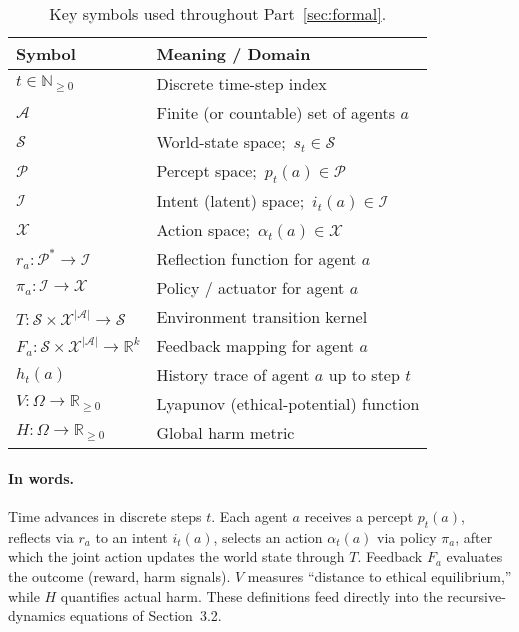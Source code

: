 \begin{table}[ht!]
\centering
\renewcommand{\arraystretch}{1.2}
\begin{tabular}{@{}ll@{}}
\toprule
\textbf{Symbol} & \textbf{Meaning / Domain} \\ \midrule
$t \in \mathbb{N}_{\ge 0}$ & Discrete time-step index \\
$\mathcal{A}$ & Finite (or countable) set of agents $a$ \\
$\mathcal{S}$ & World-state space;\ $s_t \in \mathcal{S}$ \\
$\mathcal{P}$ & Percept space;\ $p_t(a) \in \mathcal{P}$ \\
$\mathcal{I}$ & Intent (latent) space;\ $i_t(a) \in \mathcal{I}$ \\
$\mathcal{X}$ & Action space;\ $\alpha_t(a) \in \mathcal{X}$ \\
$r_a : \mathcal{P}^\ast \!\to\! \mathcal{I}$ & Reflection function for agent $a$ \\
$\pi_a : \mathcal{I} \!\to\! \mathcal{X}$ & Policy / actuator for agent $a$ \\
$T : \mathcal{S} \!\times\! \mathcal{X}^{|\mathcal{A}|} \!\to\! \mathcal{S}$ & Environment transition kernel \\
$F_a : \mathcal{S} \!\times\! \mathcal{X}^{|\mathcal{A}|} \!\to\! \mathbb{R}^k$ & Feedback mapping for agent $a$ \\
$h_t(a)$ & History trace of agent $a$ up to step $t$ \\
$V : \Omega \!\to\! \mathbb{R}_{\ge 0}$ & Lyapunov (ethical-potential) function \\
$H : \Omega \!\to\! \mathbb{R}_{\ge 0}$ & Global harm metric \\ \bottomrule
\end{tabular}
\caption{Key symbols used throughout Part~\ref{sec:formal}.}
\label{tab:notation}
\end{table}

\paragraph{In words.}%
Time advances in discrete steps $t$.  
Each agent $a$ receives a percept $p_t(a)$, reflects via $r_a$ to an intent $i_t(a)$, selects an action $\alpha_t(a)$ via policy $\pi_a$, after which the joint action updates the world state through $T$.  
Feedback $F_a$ evaluates the outcome (reward, harm signals).  
$V$ measures “distance to ethical equilibrium,” while $H$ quantifies actual harm.  
These definitions feed directly into the recursive-dynamics equations of Section~3.2.

